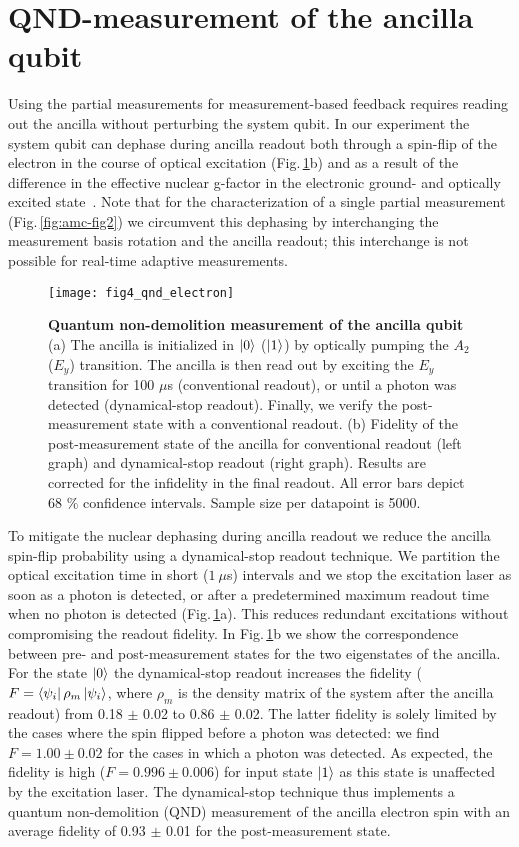 \section{QND-measurement of the ancilla qubit}
Using the partial measurements for measurement-based feedback requires reading out the ancilla without perturbing the system qubit. In our experiment the system qubit can dephase during ancilla readout both through a spin-flip of the electron in the course of optical excitation (Fig.\,\ref{fig:amc-fig4}b) and as a result of the difference in the effective nuclear g-factor in the electronic ground- and optically excited state~\cite{Jiang_PRL_2008}. Note that for the characterization of a single partial measurement (Fig.\,\ref{fig:amc-fig2}) we circumvent this dephasing by interchanging the measurement basis rotation and the ancilla readout; this interchange is not possible for real-time adaptive measurements.

\begin{figure*}
	\centering
	\texttt{[image: fig4\_qnd\_electron]}
	\caption{\label{fig:amc-fig4} \textbf{Quantum non-demolition measurement of the ancilla qubit} (a) The ancilla is initialized in $\left|0\right>$ ($\left|1\right>$) by optically pumping the $A_2$ ($E_y$) transition. The ancilla is then read out by exciting the $E_y$ transition for 100 $\mu$s (conventional readout), or until a photon was detected (dynamical-stop readout). Finally, we verify the post-measurement state with a conventional readout. (b) Fidelity of the post-measurement state of the ancilla for conventional readout (left graph) and dynamical-stop readout (right graph). Results are corrected for the infidelity in the final readout.  All error bars depict 68 $\%$ confidence intervals. Sample size per datapoint is 5000.}
\end{figure*}

To mitigate the nuclear dephasing during ancilla readout we reduce the ancilla spin-flip probability using a dynamical-stop readout technique. We partition the optical excitation time in short ($1~ \mu$s) intervals and we stop the excitation laser as soon as a photon is detected, or after a predetermined maximum readout time when no photon is detected (Fig.\,\ref{fig:amc-fig4}a). This reduces redundant excitations without compromising the readout fidelity. In Fig.\,\ref{fig:amc-fig4}b we show the correspondence between pre- and post-measurement states for the two eigenstates of the ancilla. For the state $\left|0\right>$ the dynamical-stop readout increases the fidelity ($F = \left<\psi_i\right|\rho_m \left|\psi_i\right>$, where $\rho_m$ is the density matrix of the system after the ancilla readout) from 0.18 $\pm$ 0.02 to 0.86 $\pm$ 0.02. The latter fidelity is solely limited by the cases where the spin flipped before a photon was detected: we find $F = 1.00 \pm 0.02$ for the cases in which a photon was detected. As expected, the fidelity is high ($F = 0.996 \pm 0.006$) for input state $\left|1\right>$ as this state is unaffected by the excitation laser. The dynamical-stop technique thus implements a quantum non-demolition (QND) measurement of the ancilla electron spin with an average fidelity of 0.93 $\pm$ 0.01 for the post-measurement state.

